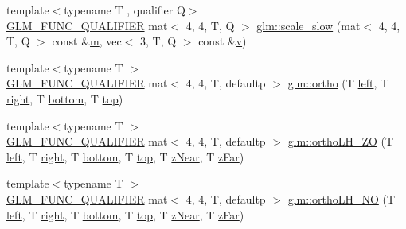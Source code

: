 \begin{DoxyCompactItemize}
\item 
{\footnotesize template$<$typename T , qualifier Q$>$ }\\\hyperlink{setup_8hpp_a33fdea6f91c5f834105f7415e2a64407}{G\+L\+M\+\_\+\+F\+U\+N\+C\+\_\+\+Q\+U\+A\+L\+I\+F\+I\+ER} mat$<$ 4, 4, T, Q $>$ \hyperlink{namespaceglm_a48c8a5c9d619e11a0e2908d7099f361f}{glm\+::scale\+\_\+slow} (mat$<$ 4, 4, T, Q $>$ const \&\hyperlink{_s_d_l__opengl__glext_8h_af593500c283bf1a787a6f947f503a5c2}{m}, vec$<$ 3, T, Q $>$ const \&\hyperlink{_s_d_l__opengl_8h_a10a82eabcb59d2fcd74acee063775f90}{v})
\item 
{\footnotesize template$<$typename T $>$ }\\\hyperlink{setup_8hpp_a33fdea6f91c5f834105f7415e2a64407}{G\+L\+M\+\_\+\+F\+U\+N\+C\+\_\+\+Q\+U\+A\+L\+I\+F\+I\+ER} mat$<$ 4, 4, T, defaultp $>$ \hyperlink{group__gtc__matrix__transform_gae5b6b40ed882cd56cd7cb97701909c06}{glm\+::ortho} (T \hyperlink{_s_d_l__opengl__glext_8h_a85b8f6c07fbc1fb5d77c2ae090f21995}{left}, T \hyperlink{_s_d_l__opengl__glext_8h_a5ffadbbacc6b89cf6218bc43b384d3fe}{right}, T \hyperlink{_s_d_l__opengl__glext_8h_a95fc257e5ddf46f7db9d5e898cdf1991}{bottom}, T \hyperlink{_s_d_l__opengl__glext_8h_a5ab323daeacf8dfdb8f91132fecdca23}{top})
\item 
{\footnotesize template$<$typename T $>$ }\\\hyperlink{setup_8hpp_a33fdea6f91c5f834105f7415e2a64407}{G\+L\+M\+\_\+\+F\+U\+N\+C\+\_\+\+Q\+U\+A\+L\+I\+F\+I\+ER} mat$<$ 4, 4, T, defaultp $>$ \hyperlink{group__gtc__matrix__transform_gab37ac3eec8d61f22fceda7775e836afa}{glm\+::ortho\+L\+H\+\_\+\+ZO} (T \hyperlink{_s_d_l__opengl__glext_8h_a85b8f6c07fbc1fb5d77c2ae090f21995}{left}, T \hyperlink{_s_d_l__opengl__glext_8h_a5ffadbbacc6b89cf6218bc43b384d3fe}{right}, T \hyperlink{_s_d_l__opengl__glext_8h_a95fc257e5ddf46f7db9d5e898cdf1991}{bottom}, T \hyperlink{_s_d_l__opengl__glext_8h_a5ab323daeacf8dfdb8f91132fecdca23}{top}, T \hyperlink{_s_d_l__opengl__glext_8h_a12d99226e590bbaaf0be69169eeb4834}{z\+Near}, T \hyperlink{_s_d_l__opengl__glext_8h_a1052a8235df129542aea6da80fbec6a1}{z\+Far})
\item 
{\footnotesize template$<$typename T $>$ }\\\hyperlink{setup_8hpp_a33fdea6f91c5f834105f7415e2a64407}{G\+L\+M\+\_\+\+F\+U\+N\+C\+\_\+\+Q\+U\+A\+L\+I\+F\+I\+ER} mat$<$ 4, 4, T, defaultp $>$ \hyperlink{group__gtc__matrix__transform_ga526416735ea7c5c5cd255bf99d051bd8}{glm\+::ortho\+L\+H\+\_\+\+NO} (T \hyperlink{_s_d_l__opengl__glext_8h_a85b8f6c07fbc1fb5d77c2ae090f21995}{left}, T \hyperlink{_s_d_l__opengl__glext_8h_a5ffadbbacc6b89cf6218bc43b384d3fe}{right}, T \hyperlink{_s_d_l__opengl__glext_8h_a95fc257e5ddf46f7db9d5e898cdf1991}{bottom}, T \hyperlink{_s_d_l__opengl__glext_8h_a5ab323daeacf8dfdb8f91132fecdca23}{top}, T \hyperlink{_s_d_l__opengl__glext_8h_a12d99226e590bbaaf0be69169eeb4834}{z\+Near}, T \hyperlink{_s_d_l__opengl__glext_8h_a1052a8235df129542aea6da80fbec6a1}{z\+Far})

\end{DoxyCompactItemize}

